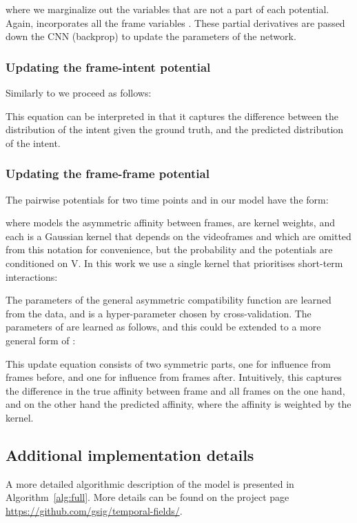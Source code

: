 \documentclass[10pt,twocolumn,letterpaper]{article}
\begin{document}
where we marginalize out the variables that are not a part of each potential. Again,  incorporates all the frame variables .
These partial derivatives are passed down the CNN (backprop) to update the parameters of the network.

\subsubsection{Updating the frame-intent potential }

Similarly to  we proceed as follows:


This equation can be interpreted in that it captures the difference between the distribution of the intent given the ground truth, and the predicted distribution of the intent.

\subsubsection{Updating the frame-frame potential }

The pairwise potentials  for two time points  and  in our model have the form:

where  models the asymmetric affinity between frames,  are kernel weights, and each  is a Gaussian kernel that depends on the videoframes  and  which are omitted from this notation for convenience, but the probability and the potentials are conditioned on V. In this work we use a single kernel that prioritises short-term interactions:

The parameters of the general asymmetric compatibility function  are learned from the data, and  is a hyper-parameter chosen by cross-validation.
The parameters of  are learned as follows, and this could be extended to a more general form of :


This update equation consists of two symmetric parts, one for influence from frames before, and one for influence from frames after. Intuitively, this captures the difference in the true affinity between frame  and all frames  on the one hand, and on the other hand the predicted affinity, where the affinity is weighted by the kernel.

\subsection{Additional implementation details}

A more detailed algorithmic description of the model is presented in Algorithm~\ref{alg:full}. More details can be found on the project page \url{https://github.com/gsig/temporal-fields/}.
\end{document}
